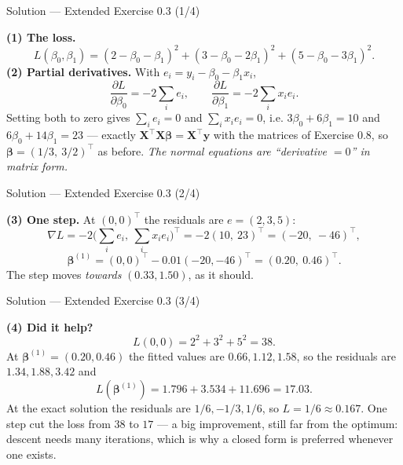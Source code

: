 \documentclass[aspectratio=169,11pt]{beamer}
\begin{document}
\begin{frame}{Solution --- Extended Exercise 0.3 (1/4)}
  \begin{solutionbox}
    \scriptsize
    \textbf{(1) The loss.}
    \[
      L(\beta_0,\beta_1) = (2-\beta_0-\beta_1)^2 + (3-\beta_0-2\beta_1)^2
                         + (5-\beta_0-3\beta_1)^2 .
    \]
    \textbf{(2) Partial derivatives.} With $e_i = y_i-\beta_0-\beta_1x_i$,
    \[
      \frac{\partial L}{\partial \beta_0} = -2\sum_i e_i,
      \qquad
      \frac{\partial L}{\partial \beta_1} = -2\sum_i x_i e_i .
    \]
    Setting both to zero gives $\sum_i e_i = 0$ and $\sum_i x_i e_i = 0$, i.e.
    $3\beta_0 + 6\beta_1 = 10$ and $6\beta_0 + 14\beta_1 = 23$ --- exactly
    $\mathbf{X}^\top\mathbf{X}\boldsymbol\beta = \mathbf{X}^\top\mathbf{y}$
    with the matrices of Exercise 0.8, so
    $\boldsymbol\beta = (1/3,\ 3/2)^\top$ as before. \emph{The normal
    equations are ``derivative $=0$'' in matrix form.}
  \end{solutionbox}
\end{frame}

\begin{frame}{Solution --- Extended Exercise 0.3 (2/4)}
  \begin{solutionbox}
    \textbf{(3) One step.} At $(0,0)^\top$ the residuals are $e = (2,3,5)$:
    \[
      \nabla L = -2\bigl(\textstyle\sum_i e_i,\ \sum_i x_i e_i\bigr)^\top
               = -2(10,\ 23)^\top = (-20,\ -46)^\top ,
    \]
    \[
      \boldsymbol\beta^{(1)} = (0,0)^\top - 0.01(-20,-46)^\top
                             = (0.20,\ 0.46)^\top .
    \]
    The step moves \emph{towards} $(0.33, 1.50)$, as it should.
  \end{solutionbox}
\end{frame}

\begin{frame}{Solution --- Extended Exercise 0.3 (3/4)}
  \begin{solutionbox}
    \scriptsize
    \textbf{(4) Did it help?}
    \[
      L(0,0) = 2^2+3^2+5^2 = 38 .
    \]
    At $\boldsymbol\beta^{(1)} = (0.20, 0.46)$ the fitted values are
    $0.66, 1.12, 1.58$, so the residuals are $1.34, 1.88, 3.42$ and
    \[
      L(\boldsymbol\beta^{(1)}) = 1.796 + 3.534 + 11.696 = 17.03 .
    \]
    At the exact solution the residuals are $1/6, -1/3, 1/6$, so
    $L = 1/6 \approx 0.167$. One step cut the loss from $38$ to $17$ --- a big
    improvement, still far from the optimum: descent needs many iterations,
    which is why a closed form is preferred whenever one exists.
  \end{solutionbox}
\end{frame}
\end{document}
